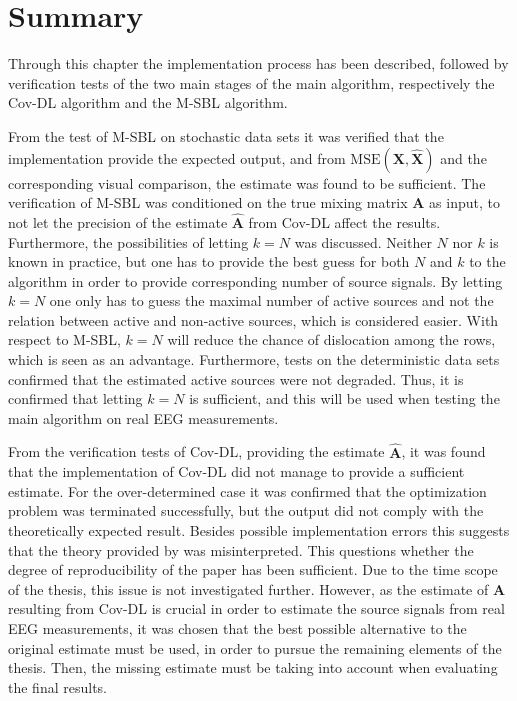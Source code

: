 \section{Summary}
Through this chapter the implementation process has been described, followed by verification tests of the two main stages of the main algorithm, respectively the Cov-DL algorithm and the M-SBL algorithm. 

From the test of M-SBL on stochastic data sets it was verified that the implementation provide the expected output, and from $\text{MSE}(\mathbf{X}, \hat{\mathbf{X}})$ and the corresponding visual comparison, the estimate was found to be sufficient. 
The verification of M-SBL was conditioned on the true mixing matrix $\mathbf{A}$ as input, to not let the precision of the estimate $\hat{\mathbf{A}}$ from Cov-DL affect the results. 
Furthermore, the possibilities of letting $k = N$ was discussed. 
Neither $N$ nor $k$ is known in practice, but one has to provide the best guess for both $N$ and $k$ to the algorithm in order to provide corresponding number of source signals. 
By letting $k = N$ one only has to guess the maximal number of active sources and not the relation between active and non-active sources, which is considered easier. 
With respect to M-SBL, $k = N$ will reduce the chance of dislocation among the rows, which is seen as an advantage. 
Furthermore, tests on the deterministic data sets confirmed that the estimated active sources were not degraded. 
Thus, it is confirmed that letting $k = N$ is sufficient, and this will be used when testing the main algorithm on real EEG measurements. 

From the verification tests of Cov-DL, providing the estimate $\hat{\mathbf{A}}$, it was found that the implementation of Cov-DL did not manage to provide a sufficient estimate. 
For the over-determined case it was confirmed that the optimization problem was terminated successfully, but the output did not comply with the theoretically expected result. 
Besides possible implementation errors this suggests that the theory provided by \cite{phd2015} was misinterpreted. This questions whether the degree of reproducibility of the paper has been sufficient. 
Due to the time scope of the thesis, this issue is not investigated further. 
However, as the estimate of $\mathbf{A}$ resulting from Cov-DL is crucial in order to estimate the source signals from real EEG measurements, it was chosen that the best possible alternative to the original estimate must be used, in order to pursue the remaining elements of the thesis. 
Then, the missing estimate must be taking into account when evaluating the final results.

